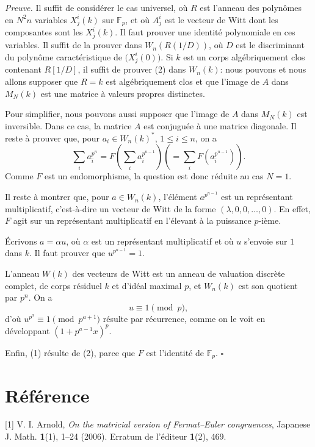 \documentclass[10pt,a4paper]{article}
\newcommand{\F}{\mathbb F}
\newcommand{\MN}{M_N}
\newcommand{\Wn}{W_n}
\theoremstyle{deligne}
\newenvironment{proofdel}{\textit{Preuve.}}{\hfill$\square$}
\begin{document}
\begin{proofdel}
Il suffit de considérer le cas universel, où \(R\) est l'anneau des polynômes en \(N^2n\) variables \(X^i_j(k)\) sur \(\F_p\), et où \(A^i_j\) est le vecteur de Witt dont les composantes sont les \(X^i_j(k)\). Il faut prouver une identité polynomiale en ces variables. Il suffit de la prouver dans \(\Wn(R(1/D))\), où \(D\) est le discriminant du polynôme caractéristique de \(\bigl(X^i_j(0)\bigr)\). Si \(k\) est un corps algébriquement clos contenant \(R[1/D]\), il suffit de prouver (2) dans \(\Wn(k)\): nous pouvons et nous allons supposer que \(R=k\) est algébriquement clos et que l'image de \(A\) dans \(\MN(k)\) est une matrice à valeurs propres distinctes.

Pour simplifier, nous pouvons aussi supposer que l'image de \(A\) dans \(\MN(k)\) est inversible. Dans ce cas, la matrice \(A\) est conjuguée à une matrice diagonale. Il reste à prouver que, pour \(a_i\in \Wn(k)^*\), \(1\le i\le n\), on a
\[
\sum_i a_i^{p^n}
=F\left(\sum_i a_i^{p^{n-1}}\right)
\left(=\sum_i F\left(a_i^{p^{n-1}}\right)\right).
\]
Comme \(F\) est un endomorphisme, la question est donc réduite au cas \(N=1\).

Il reste à montrer que, pour \(a\in \Wn(k)\), l'élément \(a^{p^{n-1}}\) est un représentant multiplicatif, c'est-à-dire un vecteur de Witt de la forme \((\lambda,0,0,\ldots,0)\). En effet, \(F\) agit sur un représentant multiplicatif en l'élevant à la puissance \(p\)-ième.

Écrivons \(a=\alpha u\), où \(\alpha\) est un représentant multiplicatif et où \(u\) s'envoie sur \(1\) dans \(k\). Il faut prouver que \(u^{p^{n-1}}=1\).

L'anneau \(W(k)\) des vecteurs de Witt est un anneau de valuation discrète complet, de corps résiduel \(k\) et d'idéal maximal \(p\), et \(\Wn(k)\) est son quotient par \(p^n\). On a
\[
u\equiv 1\pmod p,
\]
d'où \(u^{p^a}\equiv1\pmod{p^{a+1}}\) résulte par récurrence, comme on le voit en développant \((1+p^{a-1}x)^p\).

Enfin, (1) résulte de (2), parce que \(F\) est l'identité de \(\F_p\).
\end{proofdel}

\section*{Référence}

[1] V. I. Arnold, \textit{On the matricial version of Fermat--Euler congruences}, Japanese J. Math. \textbf{1}(1), 1--24 (2006). Erratum de l'éditeur \textbf{1}(2), 469.
\end{document}
